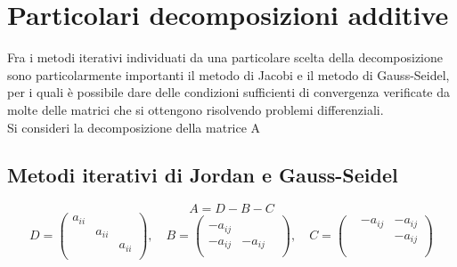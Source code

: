 

\section{Particolari decomposizioni additive}
Fra i metodi iterativi individuati da una particolare scelta della
decomposizione sono particolarmente importanti il metodo di Jacobi e
il metodo di Gauss-Seidel, per i quali \`e possibile dare delle
condizioni sufficienti di convergenza verificate da molte delle
matrici che si ottengono risolvendo problemi differenziali.\\
Si consideri la decomposizione della matrice A

\subsection{Metodi iterativi di Jordan e Gauss-Seidel}

$$ A = D- B -C $$
$$ D = \begin{pmatrix}
a_{ii}  &         &         \\
        & a_{ii}  &         \\
        &         & a_{ii}  \\
\end{pmatrix},
\quad
B = 
 \begin{pmatrix}
        &         &         \\
-a_{ij} &         &         \\
-a_{ij} & -a_{ij} &         \\
\end{pmatrix}, 
\quad 
C = 
 \begin{pmatrix}
        & -a_{ij} & -a_{ij} \\
        &         & -a_{ij} \\
        &         &         \\
\end{pmatrix} $$

